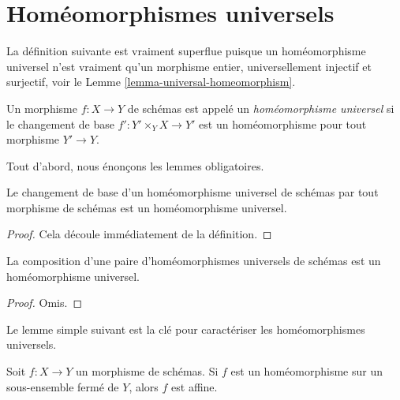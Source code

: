 \section{Homéomorphismes universels}
\label{section-universal-homeomorphisms}

\noindent
La définition suivante est vraiment superflue puisque un homéomorphisme
universel n'est vraiment qu'un morphisme entier,
universellement injectif
et surjectif, voir le Lemme \ref{lemma-universal-homeomorphism}.

\begin{definition}
\label{definition-universal-homeomorphism}
Un morphisme $f : X \to Y$ de schémas est appelé un {\it homéomorphisme universel}
si le changement de base $f' : Y' \times_Y X \to Y'$ est un homéomorphisme pour
tout morphisme $Y' \to Y$.
\end{definition}

\noindent
Tout d'abord, nous énonçons les lemmes obligatoires.

\begin{lemma}
\label{lemma-base-change-universal-homeomorphism}
Le changement de base d'un homéomorphisme universel de schémas
par tout morphisme de schémas est un homéomorphisme universel.
\end{lemma}

\begin{proof}
Cela découle immédiatement de la définition.
\end{proof}

\begin{lemma}
\label{lemma-composition-universal-homeomorphism}
La composition d'une paire d'homéomorphismes universels de schémas
est un homéomorphisme universel.
\end{lemma}

\begin{proof}
Omis.
\end{proof}

\noindent
Le lemme simple suivant est la clé pour caractériser les homéomorphismes
universels.

\begin{lemma}
\label{lemma-homeomorphism-affine}
Soit $f : X \to Y$ un morphisme de schémas. Si $f$ est un homéomorphisme sur un sous-ensemble
fermé de $Y$, alors $f$ est affine.
\end{lemma}

